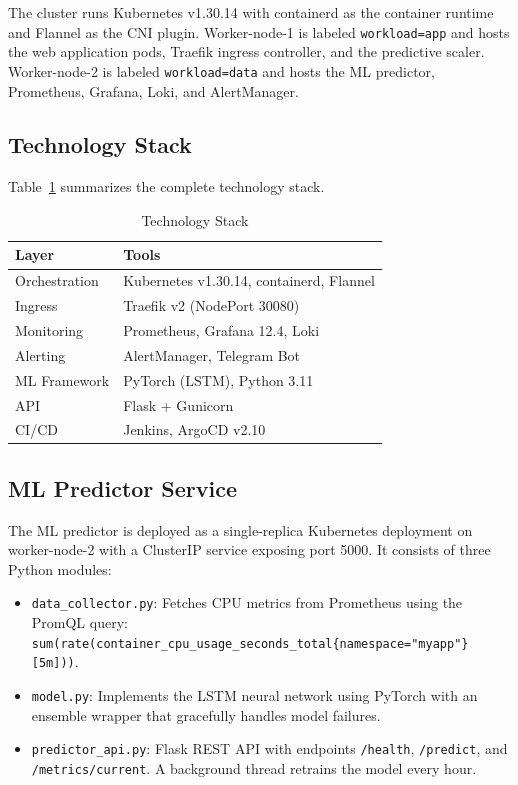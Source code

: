 \documentclass[journal]{IEEEtran}
\begin{document}
The cluster runs Kubernetes v1.30.14 with containerd as the container runtime and Flannel as the CNI plugin. Worker-node-1 is labeled \texttt{workload=app} and hosts the web application pods, Traefik ingress controller, and the predictive scaler. Worker-node-2 is labeled \texttt{workload=data} and hosts the ML predictor, Prometheus, Grafana, Loki, and AlertManager.

\subsection{Technology Stack}
Table~\ref{tab:stack} summarizes the complete technology stack.

\begin{table}[h]
\centering
\caption{Technology Stack}
\label{tab:stack}
\begin{tabular}{@{}ll@{}}
\toprule
\textbf{Layer} & \textbf{Tools} \\
\midrule
Orchestration & Kubernetes v1.30.14, containerd, Flannel \\
Ingress & Traefik v2 (NodePort 30080) \\
Monitoring & Prometheus, Grafana 12.4, Loki \\
Alerting & AlertManager, Telegram Bot \\
ML Framework & PyTorch (LSTM), Python 3.11 \\
API & Flask + Gunicorn \\
CI/CD & Jenkins, ArgoCD v2.10 \\
\bottomrule
\end{tabular}
\end{table}

\subsection{ML Predictor Service}
The ML predictor is deployed as a single-replica Kubernetes deployment on worker-node-2 with a ClusterIP service exposing port 5000. It consists of three Python modules:

\begin{itemize}
    \item \texttt{data\_collector.py}: Fetches CPU metrics from Prometheus using the PromQL query: \texttt{sum(rate(container\_cpu\_usage\_seconds\_total\{namespace="myapp"\}[5m]))}.
    \item \texttt{model.py}: Implements the LSTM neural network using PyTorch with an ensemble wrapper that gracefully handles model failures.
    \item \texttt{predictor\_api.py}: Flask REST API with endpoints \texttt{/health}, \texttt{/predict}, and \texttt{/metrics/current}. A background thread retrains the model every hour.
\end{itemize}
\end{document}
